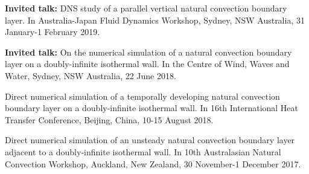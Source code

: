 \documentclass[letterpaper, 10pt]{article}
\newenvironment{changemargin}[2]{%
  \begin{list}{}{%
      \setlength{\topsep}{0pt}%
      \setlength{\leftmargin}{#1}%
      \setlength{\rightmargin}{#2}%
      \setlength{\listparindent}{\parindent}%
      \setlength{\itemindent}{\parindent}%
      \setlength{\parsep}{\parskip}%
    }%
  \item[]}{\end{list}
}
\newenvironment{body} {
  \vspace*{-16pt}
  \begin{changemargin}{-0.25in}{-0.5in}
  }
  {\end{changemargin}
}
\begin{document}
\begin{body}
  {\bf Invited talk: } DNS study of a parallel vertical natural convection boundary layer. In Australia-Japan Fluid Dynamics Workshop, Sydney, NSW Australia, 31 January-1 February 2019.
  
  \smallskip
  
  {\bf Invited talk: } On the numerical simulation of a natural convection boundary layer on a doubly-infinite isothermal wall. In the Centre of Wind, Waves and Water, Sydney, NSW Australia, 22 June 2018.
  
  \smallskip
  
  Direct numerical simulation of a temporally developing natural convection boundary layer on a doubly-infinite isothermal wall. In 16th International Heat Transfer Conference, Beijing, China, 10-15 August 2018. 
  
  \smallskip
  
  Direct numerical simulation of an unsteady natural convection boundary layer adjacent to a doubly-infinite isothermal wall. In 10th Australasian Natural Convection Workshop, Auckland, New Zealand, 30 November-1 December 2017.

\end{body}
\smallskip
\end{document}
